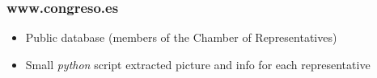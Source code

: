 \documentclass[10pt, colorlinks]{beamer}
\begin{document}
\begin{frame}
  \frametitle{www.congreso.es}
  \begin{itemize}
  \item Public database (members of the Chamber of Representatives)
  \item Small  \emph{python} script extracted picture and info for
    each representative
  \end{itemize}
  

\end{frame}
\end{document}
